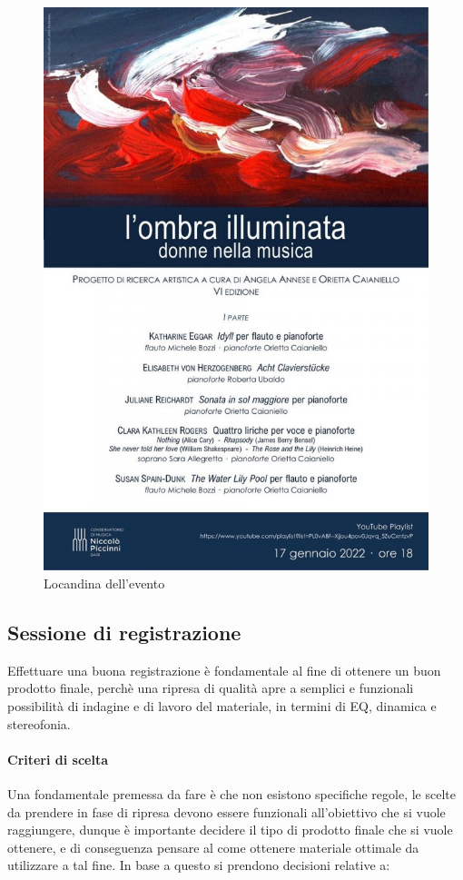	\begin{figure}[h]
		\begin{center}
			\includegraphics[width = .50\textwidth, height = .43\textheight]{img/image1.jpeg}
			\caption {Locandina dell'evento}
		\end{center}
	\end{figure}
	
	\subsection{Sessione di registrazione}
	Effettuare una buona registrazione è fondamentale al fine di ottenere un buon prodotto finale, perchè una ripresa di qualità apre a semplici e funzionali possibilità di indagine e di lavoro del materiale, in termini di EQ, dinamica e stereofonia.
	
	\paragraph{Criteri di scelta}
	Una fondamentale premessa da fare è che non esistono specifiche regole, le scelte da prendere in fase di ripresa devono essere funzionali all'obiettivo che si vuole raggiungere, dunque è importante decidere il tipo di prodotto finale che si vuole ottenere, e di conseguenza pensare al come ottenere materiale ottimale da utilizzare a tal fine. In base a questo si prendono decisioni relative a:
	
